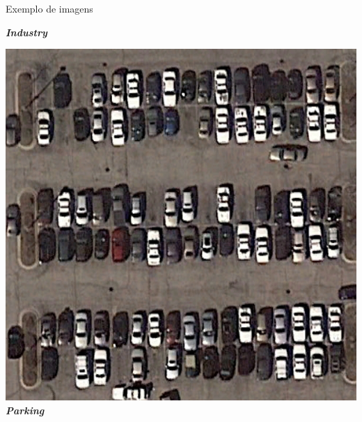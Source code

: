 \begin{frame}{Exemplo de imagens}
\begin{minipage}[b]{0.3\linewidth}
            \scriptsize \textbf{\textit{Industry}}
        \end{minipage}
        \hspace{0.03\linewidth}
        \begin{minipage}[b]{0.3\linewidth}
            \centering
            \includegraphics[width=\textwidth]{AID/parking_21.jpg}
            \scriptsize \textbf{\textit{Parking}}
        \end{minipage}
    \end{frame}
    
